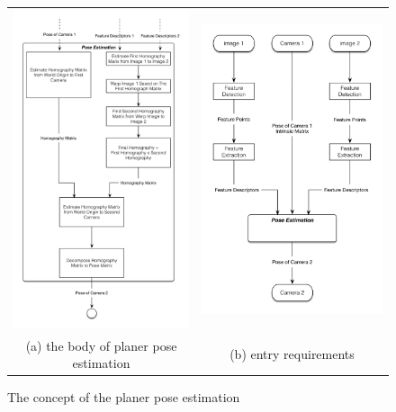 \begin{figure}[H]
\begin{tabular}{cc}
  \includegraphics[width=75mm]{figures/pose_estimation} &  \includegraphics[width=75mm]{figures/pose_estimation_body} \\
(a) the body of planer pose estimation  & (b) entry requirements \\[6pt]
\end{tabular}
\caption{The concept of the planer pose estimation}\label{fig:pose_estimation}
\end{figure}

